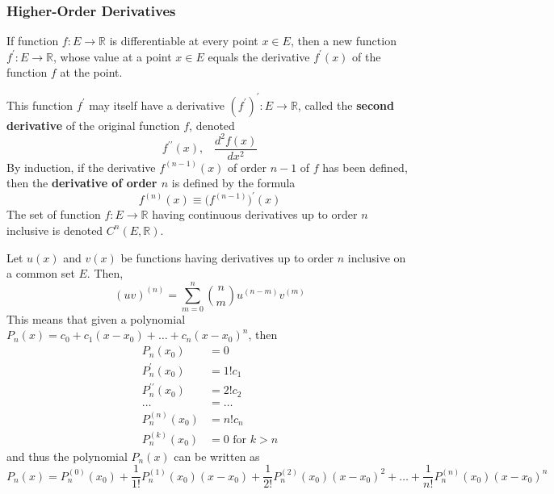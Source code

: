 \documentclass{article}
\begin{document}
    \subsubsection{Higher-Order Derivatives}

    \begin{definition}
      If function $f: E \longrightarrow \mathbb{R}$ is differentiable at every point $x \in E$, then a new function $f^\prime: E \longrightarrow \mathbb{R}$, whose value at a point $x \in E$ equals the derivative $f^\prime(x)$ of the function $f$ at the point. 
    \end{definition}

    \begin{definition}
      This function $f^\prime$ may itself have a derivative $(f^\prime)^\prime : E \longrightarrow \mathbb{R}$, called the \textbf{second derivative} of the original function $f$, denoted 
      \[f^{\prime\prime} (x), \;\;\; \frac{d^2 f(x)}{dx^2}\]
      By induction, if the derivative $f^{(n-1)} (x)$ of order $n-1$ of $f$ has been defined, then the \textbf{derivative of order $n$} is defined by the formula
      \[f^{(n)} (x) \equiv \big(f^{(n-1)}\big)^\prime (x)\]
      The set of function $f: E \longrightarrow \mathbb{R}$ having continuous derivatives up to order $n$ inclusive is denoted $C^{n} (E, \mathbb{R})$. 
    \end{definition}

    \begin{lemma}
      Let $u(x)$ and $v(x)$ be functions having derivatives up to order $n$ inclusive on a common set $E$. Then, 
      \[(uv)^{(n)} = \sum_{m = 0}^n \binom{n}{m} u^{(n-m)} v^{(m)}\]
      This means that given a polynomial $P_n (x) = c_0 + c_1 (x - x_0) + \ldots + c_n (x - x_0)^n$, then 
      \begin{align*}
          P_n(x_0) & = 0 \\
          P_n^\prime (x_0) & = 1! c_1 \\
          P_n^{\prime\prime} (x_0) & = 2! c_2 \\
          \ldots & = \ldots \\
          P_n^{(n)} (x_0) & = n! c_n \\
          P_n^{(k)} (x_0) & = 0 \text{ for } k > n
      \end{align*}
      and thus the polynomial $P_n (x)$ can be written as
      \[P_n (x) = P_n^{(0)} (x_0) + \frac{1}{1!} P_n^{(1)} (x_0) (x-x_0) + \frac{1}{2!} P_n^{(2)} (x_0) (x-x_0)^2 + \ldots + \frac{1}{n!} P_n^{(n)} (x_0) (x-x_0)^n\]
    \end{lemma}
\end{document}
